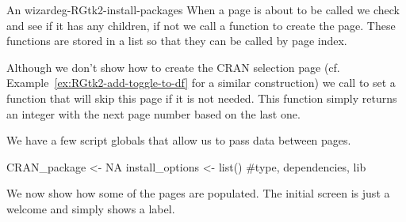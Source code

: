 \begin{example}{An  wizard}{eg-RGtk2-install-packages}
When a page is about to be called we check and see if it has any
children, if not we call a function to create the page. These
functions are stored in a list so that they can be called by page index.
\begin{Schunk}
\end{Schunk}

Although we don't show how to create the CRAN selection page
(cf. Example~\ref{ex:RGtk2-add-toggle-to-df} for a similar
construction) we call  to set
a function that will skip this page if it is not needed. This function
simply returns an integer with the next page number based on the last one.
\begin{Schunk}
\end{Schunk}

We have a few script globals that allow us to pass data between pages.
\begin{Schunk}
\begin{Sinput}
 CRAN_package <- NA
 install_options <- list() #type, dependencies, lib
\end{Sinput}
\end{Schunk}






We now show how some of the pages are populated. The initial screen is
just a welcome and simply shows a label.

\begin{Schunk}
\end{Schunk}



\end{example}
